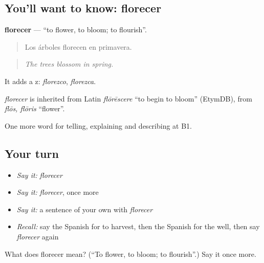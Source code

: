 \subsection*{You'll want to know: florecer}
\textbf{florecer} — \textquotedblleft{}to flower, to bloom; to flourish\textquotedblright{}.

\begin{quote}
Los árboles florecen en primavera.
\end{quote}

\begin{quote}
\emph{The trees blossom in spring.}
\end{quote}

It adds a z: \emph{florezco}, \emph{florezca}.

\begin{cousinweb}
\emph{florecer} is inherited from Latin \emph{flōrēscere} \textquotedblleft{}to begin to bloom\textquotedblright{} (EtymDB), from \emph{flōs, flōris} \textquotedblleft{}flower\textquotedblright{}.
\end{cousinweb}

\begin{grammarlens}[title={What you've built}]
One more word for telling, explaining and describing at B1.
\end{grammarlens}

\subsection*{Your turn}
\begin{itemize}
\raggedright
  \item \emph{Say it:} \emph{florecer}
  \item \emph{Say it:} \emph{florecer}, once more
  \item \emph{Say it:} a sentence of your own with \emph{florecer}
  \item \emph{Recall:} say the Spanish for to harvest, then the Spanish for the well, then say \emph{florecer} again
\end{itemize}

\begin{tcolorbox}[breakable,colback=teal!4,colframe=teal!35!black,title={Before you move on}]
What does florecer mean? (\textquotedblleft{}To flower, to bloom; to flourish\textquotedblright{}.) Say it once more.
\end{tcolorbox}
